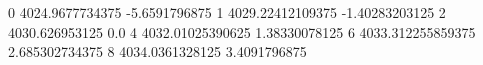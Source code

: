0 4024.9677734375 -5.6591796875
1 4029.22412109375 -1.40283203125
2 4030.626953125 0.0
4 4032.01025390625 1.38330078125
6 4033.312255859375 2.685302734375
8 4034.0361328125 3.4091796875
